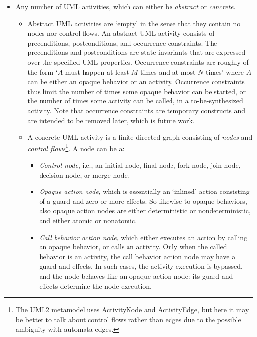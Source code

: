 \documentclass{article}
\theoremstyle{definition}
\begin{document}
\begin{description}
\begin{itemize}
		A UML constraint can be a state invariant that is expressed over the UML properties in the UML model.
		A UML constraint can also be an action exclusion invariant, which indicates that starting the execution of some action requires the system to be in a certain state as expressed by the state invariant.
		\item Any number of UML activities, which can either be \emph{abstract} or \emph{concrete}.
		\begin{itemize}
			\item Abstract UML activities are `empty' in the sense that they contain no nodes nor control flows.
			An abstract UML activity consists of preconditions, postconditions, and occurrence constraints.
			The preconditions and postconditions are state invariants that are expressed over the specified UML properties.
			Occurrence constraints are roughly of the form `$A$ must happen at least $M$ times and at most $N$ times' where $A$ can be either an opaque behavior or an activity.
			Occurrence constraints thus limit the number of times some opaque behavior can be started, or the number of times some activity can be called, in a to-be-synthesized activity.
			Note that occurrence constraints are temporary constructs and are intended to be removed later, which is future work.
			\item A concrete UML activity is a finite directed graph consisting of \emph{nodes} and \emph{control flows}\footnote{The UML2 metamodel uses \textsf{ActivityNode} and \textsf{ActivityEdge}, but here it may be better to talk about control flows rather than edges due to the possible ambiguity with automata edges.}.
			A node can be a:
			\begin{itemize}
				\item \emph{Control node}, i.e., an initial node, final node, fork node, join node, decision node, or merge node.
				\item \emph{Opaque action node}, which is essentially an `inlined' action consisting of a guard and zero or more effects.
				So likewise to opaque behaviors, also opaque action nodes are either deterministic or nondeterministic, and either atomic or nonatomic.
				\item \emph{Call behavior action node}, which either executes an action by calling an opaque behavior, or calls an activity. 
				Only when the called behavior is an activity, the call behavior action node may have a guard and effects. 
				In such cases, the activity execution is bypassed, and the node behaves like an opaque action node: its guard and effects determine the node execution. 

\end{itemize}
\end{itemize}
\end{itemize}
\end{description}
\end{document}
